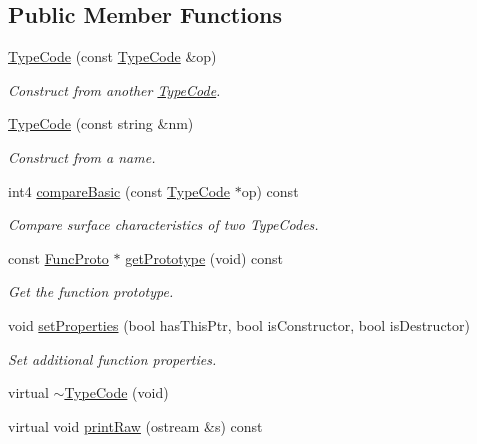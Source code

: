 \subsection*{Public Member Functions}
\begin{DoxyCompactItemize}
\item 
\mbox{\hyperlink{class_type_code_a85184f290572a138c890d7d5035c8fdc}{Type\+Code}} (const \mbox{\hyperlink{class_type_code}{Type\+Code}} \&op)
\begin{DoxyCompactList}\small\item\em Construct from another \mbox{\hyperlink{class_type_code}{Type\+Code}}. \end{DoxyCompactList}\item 
\mbox{\hyperlink{class_type_code_aea0c166ae7ae389f37808b17e58b582a}{Type\+Code}} (const string \&nm)
\begin{DoxyCompactList}\small\item\em Construct from a name. \end{DoxyCompactList}\item 
int4 \mbox{\hyperlink{class_type_code_a281927644a409f943d0ed740c510227a}{compare\+Basic}} (const \mbox{\hyperlink{class_type_code}{Type\+Code}} $\ast$op) const
\begin{DoxyCompactList}\small\item\em Compare surface characteristics of two Type\+Codes. \end{DoxyCompactList}\item 
const \mbox{\hyperlink{class_func_proto}{Func\+Proto}} $\ast$ \mbox{\hyperlink{class_type_code_a2c6a4552d7ac88c7597f22479f5e11b0}{get\+Prototype}} (void) const
\begin{DoxyCompactList}\small\item\em Get the function prototype. \end{DoxyCompactList}\item 
void \mbox{\hyperlink{class_type_code_a12a5097d49a87e482795d0b299d718cc}{set\+Properties}} (bool has\+This\+Ptr, bool is\+Constructor, bool is\+Destructor)
\begin{DoxyCompactList}\small\item\em Set additional function properties. \end{DoxyCompactList}\item 
virtual \mbox{\hyperlink{class_type_code_a616085985a512843cec883203879b4c5}{$\sim$\+Type\+Code}} (void)
\item 
virtual void \mbox{\hyperlink{class_type_code_a1e8d400271941042d3dcb8402876ce02}{print\+Raw}} (ostream \&s) const

\end{DoxyCompactItemize}
